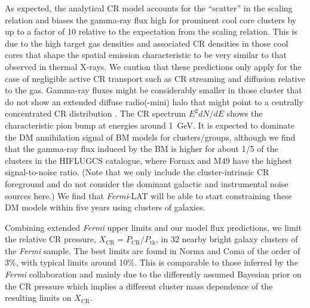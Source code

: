 \documentclass[10pt,aps,pra,reprint,amsmath,amsfonts,amssymb,showpacs,nofootinbib,floatfix]{revtex4-1}
\newcommand{\Fermi}{{\em Fermi}\xspace}
\newcommand{\rmn}{\mathrm}
\newcommand{\CR}{\rmn{CR}}
\begin{document}
As expected, the analytical CR model accounts for the ``scatter'' in the scaling
relation and biases the gamma-ray flux high for prominent cool core clusters by
up to a factor of 10 relative to the expectation from the scaling relation. This
is due to the high target gas densities and associated CR densities in those
cool cores that shape the spatial emission characteristic to be very similar to
that observed in thermal X-rays. We caution that these predictions only apply
for the case of negligible active CR transport such as CR streaming and
diffusion relative to the gas. Gamma-ray fluxes might be considerably smaller in
those cluster that do not show an extended diffuse radio(-mini) halo that might
point to a centrally concentrated CR distribution
\cite{2011A&A...527A..99E}. The CR spectrum $E^2 dN/dE$ shows the characteristic
pion bump at energies around 1~GeV. It is expected to dominate the DM
annihilation signal of BM models for clusters/groups, although we find that the
gamma-ray flux induced by the BM is higher for about 1/5 of the clusters in the
HIFLUGCS catalogue, where Fornax and M49 have the highest signal-to-noise
ratio. (Note that we only include the cluster-intrinsic CR foreground and do not
consider the dominant galactic and instrumental noise sources here.) We find that
\Fermi-LAT will be able to start constraining these DM models within five years
using clusters of galaxies.

Combining extended \Fermi upper limits and our model flux predictions, we limit
the relative CR pressure, $X_\CR = P_\CR/P_\rmn{th}$, in 32 nearby bright galaxy
clusters of the \Fermi sample. The best limits are found in Norma and Coma of
the order of 3\%, with typical limits around 10\%. This is comparable to those
inferred by the \Fermi collaboration \cite{2010ApJ...717L..71A} and mainly due
to the differently assumed Bayesian prior on the CR pressure which implies a
different cluster mass dependence of the resulting limits on $X_\CR$.


\end{document}
